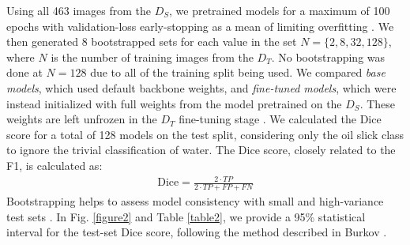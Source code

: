 \documentclass[lettersize,journal]{IEEEtran}
\begin{document}
Using all 463 images from the $\mathit{D}_S$, we pretrained models for a maximum of 100 epochs with validation-loss early-stopping as a mean of limiting overfitting \cite{wangGeneralizingFewExamples2020}. 
We then generated 8 bootstrapped sets for each value in the set \( N = \{ 2, 8, 32, 128\} \), where \( N \) is the number of 
training images from the $\mathit{D}_T$. No bootstrapping was done at \( N = 128 \) due to all of the training split being used. We compared \textit{base models}, which used
default backbone weights, and \textit{fine-tuned models}, which were instead initialized with full weights from the model pretrained on the $\mathit{D}_S$. These weights are left unfrozen in the $\mathit{D}_T$ 
fine-tuning stage \cite{yosinskiHowTransferableAre2014}. We calculated the Dice score for a total of 128 models on the test split, considering only the oil slick class to ignore the trivial classification of water. 
The Dice score, closely related to the F1, is calculated as:
\begin{align}
    \text{Dice} = \frac{2 \cdot TP}{2 \cdot TP + FP + FN}
\end{align}
Bootstrapping helps to assess model consistency with small and high-variance test sets \cite{mollersenAccountingMultiplicityMachine2024}. In Fig. \ref{figure2} and Table \ref{table2},
we provide a 95\% statistical interval for the test-set Dice score, following the method described in Burkov \cite{burkovMachineLearningEngineering2020}.
\end{document}
